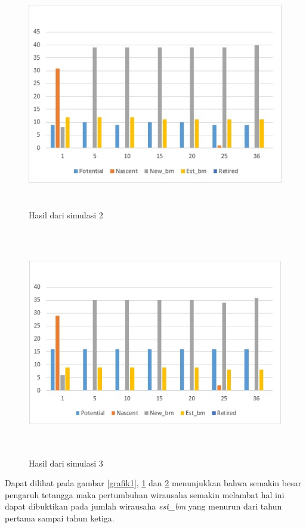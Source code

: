 	\begin{figure} [H]
	\centering  
	\includegraphics[width=12cm, height=10cm]{grafik2} 
		\caption[Hasil dari simulasi]{Hasil dari simulasi 2}
	\label{grafik2} 
\end{figure}

	\begin{figure} [H]
	\centering  
	\includegraphics[width=12cm, height=10cm]{grafik3} 
		\caption[Hasil dari simulasi]{Hasil dari simulasi 3}
	\label{grafik3} 
\end{figure}

Dapat dilihat pada gambar \ref{grafik1}, \ref{grafik2} dan \ref{grafik3} menunjukkan bahwa semakin besar pengaruh tetangga maka pertumbuhan wirausaha semakin melambat hal ini dapat dibuktikan pada jumlah wirausaha \textit{est\_bm} yang menurun dari tahun pertama sampai tahun ketiga.

